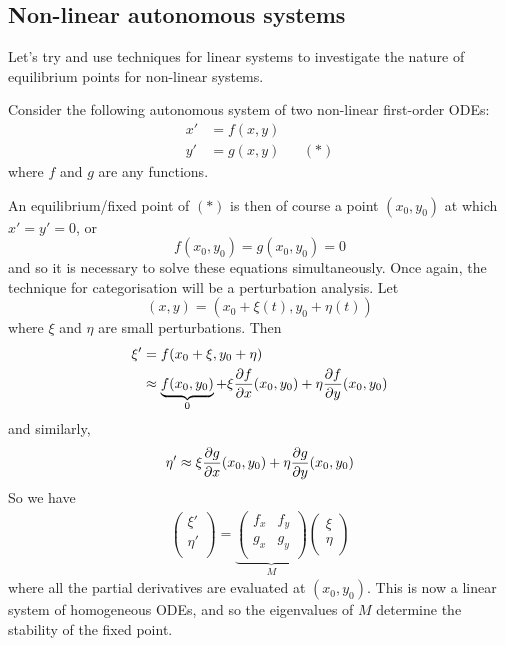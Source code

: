 \documentclass{../template/note}
\begin{document}
    
    \subsection{Non-linear autonomous systems}

    Let's try and use techniques for linear systems to investigate the nature of equilibrium points for non-linear systems.

    Consider the following autonomous system of two non-linear first-order ODEs:
    \begin{align*}
        x' &= f(x, y) \\
        y' &= g(x, y) && (*)
    \end{align*}
    where \(f\) and \(g\) are any functions.
    
    An equilibrium/fixed point of \((*)\) is then of course a point \((x_0, y_0)\) at which \(x' = y' = 0\), or
    \[
        f(x_0, y_0) = g(x_0, y_0) = 0
    \]
    and so it is necessary to solve these equations simultaneously. Once again, the technique for categorisation will be a perturbation analysis. Let
    \[
        (x, y) = (x_0 + \xi(t), y_0 + \eta(t))
    \]
    where \(\xi\) and \(\eta\) are small perturbations. Then
    \begin{align*}
        \xi' &= f(x_0 + \xi, y_0 + \eta) \\
        &\approx \underbrace{f(x_0, y_0)}_{0} + \xi \pd f x(x_0, y_0) + \eta \pd f y (x_0, y_0)
    \end{align*}
    and similarly,
    \[
        \eta' \approx \xi \pd g x(x_0, y_0) + \eta \pd g y (x_0, y_0)
    \]
    So we have
    \begin{align*}
        \begin{pmatrix}
         \xi' \\
         \eta' \\
        \end{pmatrix} = \underbrace{\begin{pmatrix}
         f_x & f_y \\
         g_x & g_y \\
        \end{pmatrix}}_M \begin{pmatrix}
         \xi \\
         \eta \\
        \end{pmatrix}
    \end{align*}
    where all the partial derivatives are evaluated at \((x_0, y_0)\). This is now a linear system of homogeneous ODEs, and so the eigenvalues of \(M\) determine the stability of the fixed point.
    
\end{document}
